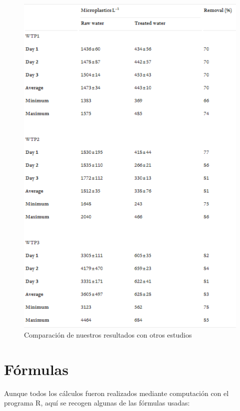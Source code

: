 \documentclass[a4paper,11pt]{article}
\begin{document}
	\begin{figure}[h!]
		\centering
		\includegraphics[scale=0.9]{tabla.png}
		\caption{Comparación de nuestros resultados con otros estudios}
	\end{figure}
\section{Fórmulas}
	Aunque todos los cálculos fueron realizados mediante computación con el programa R, aquí se recogen algunas de las fórmulas usadas:
	
	
\end{document}
